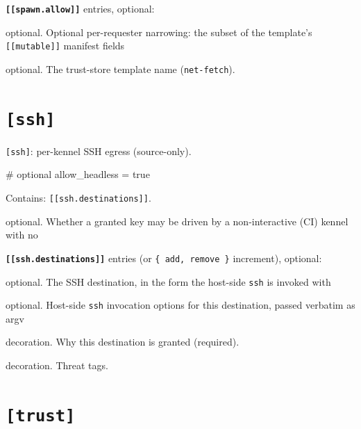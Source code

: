 \textbf{\texttt{{[}{[}spawn.allow{]}{]}}} entries, optional:

\begin{description}
\tightlist
\item[\texttt{mutable}]
optional. Optional per-requester narrowing: the subset of the template's
\texttt{{[}{[}mutable{]}{]}} manifest fields
\item[\texttt{template}]
optional. The trust-store template name (\texttt{net-fetch}).
\end{description}

\hypertarget{ssh}{%
\section{\texorpdfstring{\texttt{{[}ssh{]}}}{{[}ssh{]}}}\label{ssh}}

\texttt{{[}ssh{]}}: per-kennel SSH egress (source-only).

\begin{kennelcode}
[ssh]
# optional
allow_headless = true
\end{kennelcode}

Contains: \texttt{{[}{[}ssh.destinations{]}{]}}.

\begin{description}
\tightlist
\item[\texttt{allow\_headless}]
optional. Whether a granted key may be driven by a non-interactive (CI)
kennel with no
\end{description}

\textbf{\texttt{{[}{[}ssh.destinations{]}{]}}} entries (or
\texttt{\{\ add,\ remove\ \}} increment), optional:

\begin{description}
\tightlist
\item[\texttt{dest}]
optional. The SSH destination, in the form the host-side \texttt{ssh} is
invoked with
\item[\texttt{options}]
optional. Host-side \texttt{ssh} invocation options for this
destination, passed verbatim as argv
\item[\texttt{reason}]
decoration. Why this destination is granted (required).
\item[\texttt{threats}]
decoration. Threat tags.
\end{description}

\hypertarget{trust}{%
\section{\texorpdfstring{\texttt{{[}trust{]}}}{{[}trust{]}}}\label{trust}}


